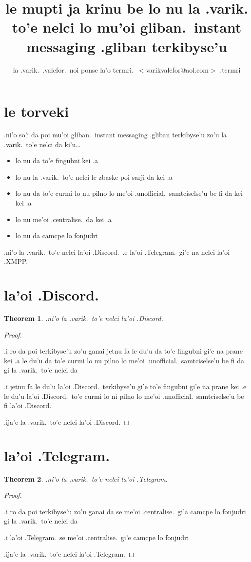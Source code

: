 \documentclass{article}
\title{le mupti ja krinu be lo nu la .varik. to'e nelci lo mu'oi gliban.\ instant messaging .gliban terkibyse'u}
\author{la .varik.\ .valefor.\ noi ponse la'o termri.\ $<$varikvalefor@aol.com$>$ .termri}
\newtheorem{thm}{Theorem}
\begin{document}
\maketitle

\section{le torveki}
.ni'o so'i da poi mu'oi gliban.\ instant messaging .gliban terkibyse'u zo'u la .varik.\ to'e nelci da ki'u\ldots
\begin{itemize}
	\item lo nu da to'e fingubni kei .a
	\item lo nu la .varik.\ to'e nelci le zbaske poi sarji da kei .a
	\item lo nu da to'e curmi lo nu pilno lo me'oi .unofficial.\ samtciselse'u be fi da kei kei .a
	\item lo nu me'oi .centralise.\ da kei .a
	\item lo nu da camcpe lo fonjudri
\end{itemize}

.ni'o la .varik.\ to'e nelci la'oi .Discord.\ .e la'oi .Telegram.\ gi'e na nelci la'oi .XMPP.
\section{la'oi .Discord.}
\begin{thm}
	.ni'o la .varik.\ to'e nelci la'oi .Discord.
\end{thm}
\begin{proof}
	${}$

	.i ro da poi terkibyse'u zo'u ganai jetnu fa le du'u da to'e fingubni gi'e na prane kei .a le du'u da to'e curmi lo nu pilno lo me'oi .unofficial.\ samtciselse'u be fi da gi la .varik.\ to'e nelci da

	.i jetnu fa le du'u la'oi .Discord.\ terkibyse'u gi'e to'e fingubni gi'e na prane kei .e le du'u la'oi .Discord.\ to'e curmi lo ni pilno lo me'oi .unofficial.\ samtciselse'u be fi la'oi .Discord.

	.ija'e la .varik.\ to'e nelci la'oi .Discord.
\end{proof}

\section{la'oi .Telegram.}
\begin{thm}
	.ni'o la .varik.\ to'e nelci la'oi .Telegram.
\end{thm}
\begin{proof}
	${}$

	.i ro da poi terkibyse'u zo'u ganai da se me'oi .centralise.\ gi'a camcpe lo fonjudri gi la .varik.\ to'e nelci da

	.i la'oi .Telegram.\ se me'oi .centralise.\ gi'e camcpe lo fonjudri

	.ija'e la .varik.\ to'e nelci la'oi .Telegram.
\end{proof}
\end{document}
